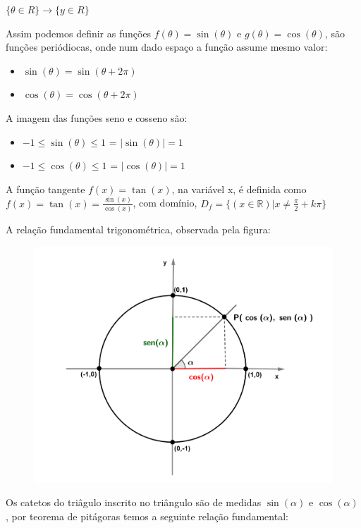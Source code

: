 \begin{multicols*}{2}
    $\{\theta \in R \} \rightarrow \{ y \in R\}$

    Assim podemos definir as funções $f(\theta) = \sin(\theta)$ e $g(\theta) = \cos(\theta)$, são funções periódiocas, onde num dado espaço a função assume mesmo valor:
    \begin{itemize}
        \item $\sin(\theta) = \sin(\theta  + 2 \pi)$
        \item $\cos(\theta) = \cos(\theta +  2 \pi)$
    \end{itemize}

    A imagem das funções seno e cosseno são:
    \begin{itemize}
        \item $-1 \le \sin(\theta) \le 1$ = $|\sin(\theta)| = 1$
        \item $-1 \le \cos(\theta) \le 1$ = $|\cos(\theta)| = 1$
    \end{itemize}

    A função tangente $f(x)  = \tan(x)$, na variável x, é definida como
    $f(x) = \tan(x) = \frac{\sin(x)}{\cos(x)}$, com domínio,
    $D_f = \{ (x \in \mathbb{R})| x \ne \frac{\pi}{2} + k \pi \}$

    A relação fundamental trigonométrica, observada pela figura:
    \begin{figure}[H]
        \centering
        \includegraphics[scale=0.15]{assets/rafael/img32.png}
    \end{figure}
    Os catetos do triâgulo inscrito no triângulo são de medidas $\sin(\alpha)$ e $\cos(\alpha)$, por teorema de pitágoras temos a seguinte relação fundamental:


\end{multicols*}

